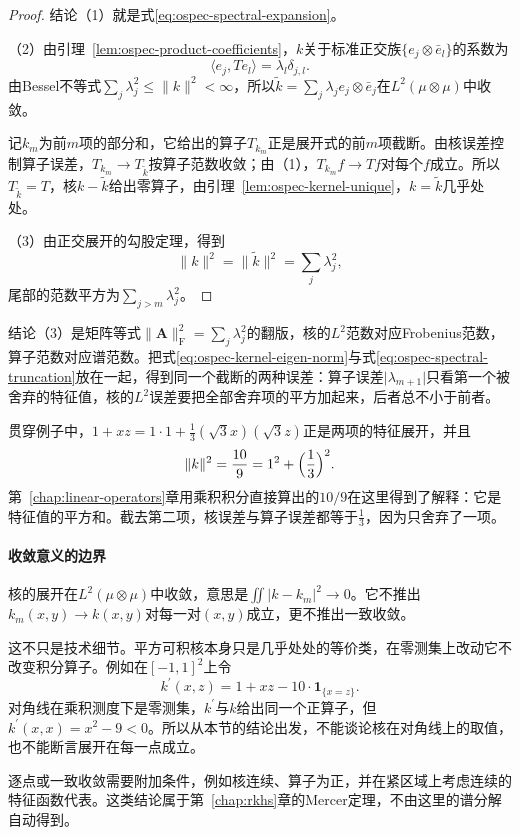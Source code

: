\begin{proof}
结论（1）就是式\eqref{eq:ospec-spectral-expansion}。

（2）由引理~\ref{lem:ospec-product-coefficients}，$k$关于标准正交族$\{e_j\otimes\bar e_l\}$的系数为
\[
\langle e_j,Te_l\rangle=\lambda_l\delta_{j,l}.
\]
由Bessel不等式$\sum_j\lambda_j^2\leq\lVert k\rVert^2<\infty$，所以$\tilde k=\sum_j\lambda_je_j\otimes\bar e_j$在$L^2(\mu\otimes\mu)$中收敛。

记$k_m$为前$m$项的部分和，它给出的算子$T_{k_m}$正是展开式的前$m$项截断。由核误差控制算子误差，$T_{k_m}\to T_{\tilde k}$按算子范数收敛；由（1），$T_{k_m}f\to Tf$对每个$f$成立。所以$T_{\tilde k}=T$，核$k-\tilde k$给出零算子，由引理~\ref{lem:ospec-kernel-unique}，$k=\tilde k$几乎处处。

（3）由正交展开的勾股定理，得到
\[
\lVert k\rVert^2=\lVert\tilde k\rVert^2=\sum_j\lambda_j^2,
\]
尾部的范数平方为$\sum_{j>m}\lambda_j^2$。
\end{proof}

结论（3）是矩阵等式$\lVert\bm A\rVert_{\mathrm F}^2=\sum_j\lambda_j^2$的翻版，核的$L^2$范数对应Frobenius范数，算子范数对应谱范数。把式\eqref{eq:ospec-kernel-eigen-norm}与式\eqref{eq:ospec-spectral-truncation}放在一起，得到同一个截断的两种误差：算子误差$\lvert\lambda_{m+1}\rvert$只看第一个被舍弃的特征值，核的$L^2$误差要把全部舍弃项的平方加起来，后者总不小于前者。

贯穿例子中，$1+xz=1\cdot1+\frac13(\sqrt3x)(\sqrt3z)$正是两项的特征展开，并且
\[
\lVert k\rVert^2=\frac{10}{9}=1^2+\Bigl(\frac13\Bigr)^2 .
\]
第~\ref{chap:linear-operators}章用乘积积分直接算出的$10/9$在这里得到了解释：它是特征值的平方和。截去第二项，核误差与算子误差都等于$\frac13$，因为只舍弃了一项。

\paragraph{收敛意义的边界}
核的展开在$L^2(\mu\otimes\mu)$中收敛，意思是$\iint\lvert k-k_m\rvert^2\to0$。它不推出$k_m(x,y)\to k(x,y)$对每一对$(x,y)$成立，更不推出一致收敛。

这不只是技术细节。平方可积核本身只是几乎处处的等价类，在零测集上改动它不改变积分算子。例如在$[-1,1]^2$上令
\[
k^\prime(x,z)=1+xz-10\cdot\mathbf 1_{\{x=z\}} .
\]
对角线在乘积测度下是零测集，$k^\prime$与$k$给出同一个正算子，但$k^\prime(x,x)=x^2-9<0$。所以从本节的结论出发，不能谈论核在对角线上的取值，也不能断言展开在每一点成立。

逐点或一致收敛需要附加条件，例如核连续、算子为正，并在紧区域上考虑连续的特征函数代表。这类结论属于第~\ref{chap:rkhs}章的Mercer定理，不由这里的谱分解自动得到。

